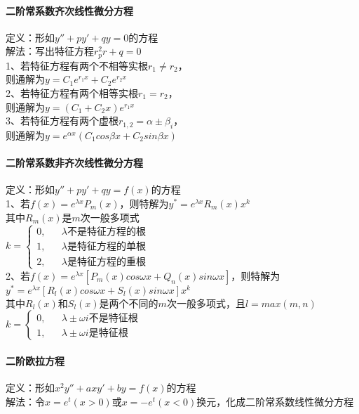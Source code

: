 \documentclass{article}
\begin{document}
\begin{flushleft}
	 \paragraph{二阶常系数齐次线性微分方程}
	 定义：形如$y''+py'+qy=0$的方程\\
	 解法：写出特征方程$r^2_pr+q=0$\\
	 1、若特征方程有两个不相等实根$r_1\neq r_2$，\\
	 则通解为$y=C_1e^{r_1x}+C_2e^{r_2x}$\\
	 2、若特征方程有两个相等实根$r_1=r_2$，\\
	 则通解为$y=(C_1+C_2x)e^{r_1x}$\\
	 3、若特征方程有两个虚根$r_{1,2}=\alpha\pm\beta_i$，\\
	 则通解为$y=e^{\alpha x}(C_1cos\beta x+C_2sin\beta x)$\\
	 
	 \paragraph{二阶常系数非齐次线性微分方程}
	 定义：形如$y''+py'+qy=f(x)$的方程\\
	 1、若$f(x)=e^{\lambda x}P_m(x)$，则特解为$y^*=e^{\lambda x}R_m(x)x^k$\\
	 其中$R_m(x)$是$m$次一般多项式\\
	 $k=\left\{
	 \begin{array}{rcl}
	 0,& & \lambda\mbox{不是特征方程的根}\\
	 1,& & \lambda\mbox{是特征方程的单根}\\
	 2,& & \lambda\mbox{是特征方程的重根}
	 \end{array} \right.$\\
	 2、若$f(x)=e^{\lambda x}[P_m(x)cos\omega x+Q_n(x)sin\omega x]$，则特解为$y^*=e^{\lambda x}[R_l(x)cos\omega x+S_l(x)sin\omega x]x^k$\\
	 其中$R_l(x)$和$S_l(x)$是两个不同的$m$次一般多项式，且$l=max(m,n)$\\
	 $k=\left\{
	 \begin{array}{rcl}
	 0,& & \lambda\pm\omega i\mbox{不是特征根}\\
	 1,& & \lambda\pm\omega i\mbox{是特征根}
	 \end{array} \right.$\\
	 
	 \paragraph{二阶欧拉方程}
	 定义：形如$x^2y''+axy'+by=f(x)$的方程\\
	 解法：令$x=e^t (x>0)$或$x=-e^t (x<0)$换元，化成二阶常系数线性微分方程\\
	 
\end{flushleft}
\end{document}

